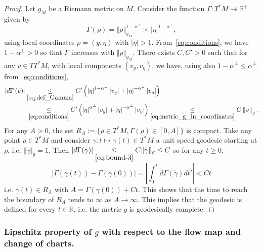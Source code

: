 \documentclass[10pt]{amsart}
\theoremstyle{definition}\newtheorem{defi}[theo]{Definition}\newtheorem{rema}[theo]{Remark}\newtheorem{exam}[theo]{Example}\newtheorem{exem}[theo]{Example}\newtheorem{nota}[theo]{Notation}
\newcommand{\bbR}{\mathbb{R}}
\begin{document}
\begin{proof}
Let $g_{M}$ be a Riemann metric on $M$. Consider the function $\Gamma:T^{*}M\rightarrow\bbR^{+}$ given by
\begin{equation}\label{eq:def_Gamma}
\Gamma\left(\rho\right)=\left\Vert \rho\right\Vert _{g_{M}}^{1-\alpha^{\perp}}\asymp\left|\eta\right|^{1-\alpha^{\perp}},
\end{equation}
using local coordinates $\rho=(y,\eta)$ with $|\eta|>1$. From~\eqref{eq:conditions}, we have $1-\alpha^{\perp}>0$ so that $\Gamma$ increases with $\Vert \rho\Vert _{g_{M}}$. There exists $C,C'>0$ such that for any $v\in TT^{*}M$, with local components $(v_{y},v_{\eta})$, we have, using also $1-\alpha^{\perp}\leq\alpha^{\perp}$ from~\eqref{eq:conditions},
\begin{equation}\label{eq:bound-3}
\begin{split}
\left|d\Gamma\left(v\right)\right|&\underset{\eqref{eq:def_Gamma}}{\leq}C'\left(\left|\eta\right|^{1-\alpha^{\perp}}\left|v_{y}\right|+\left|\eta\right|^{-\alpha^{\perp}}\left|v_{\eta}\right|\right)\\
&\;\underset{\eqref{eq:conditions}}{\leq}C'\left(\left|\eta\right|^{\alpha^{\perp}}\left|v_{y}\right|+\left|\eta\right|^{-\alpha^{\perp}}\left|v_{\eta}\right|\right)\underset{\eqref{eq:metric_g_in_coordinates}}{\leq}C\left\Vert v\right\Vert _{g}.
\end{split}
\end{equation}
For any $A>0$, the set $R_{A}:=\{ \rho\in T^{*}M,\Gamma(\rho)\in[0,A]\} $ is compact. Take any point $\rho\in T^{*}M$ and consider $\gamma:t\mapsto\gamma(t)\in T^{*}M$ a unit speed geodesic starting at $\rho$, i.e. $\Vert \dot{\gamma}\Vert _{g}=1$. Then $|d\Gamma(\dot{\gamma})|\underset{\eqref{eq:bound-3}}{\leq}C\Vert \dot{\gamma}\Vert _{g}\leq C$ so for any $t\geq0$,
\[
\big|\Gamma\left(\gamma\left(t\right)\right)-\Gamma\left(\gamma\left(0\right)\right)\big|=\left|\int_{0}^{t}d\Gamma\left(\dot{\gamma}\right)dt'\right|<Ct
\]
i.e. $\gamma(t)\in R_{A}$ with $A=\Gamma(\gamma(0))+Ct$. This shows that the time to reach the boundary of $R_{A}$ tends to $\infty$ as $A\rightarrow\infty$. This implies that the geodesic is defined for every $t\in\bbR$, i.e. the metric $g$ is geodesically complete.
\end{proof}

\subsubsection{\label{subsec:Lipschitz-property-of}
Lipschitz property of \texorpdfstring{$g$}{g} with respect to the flow map and change of charts.}
\end{document}
